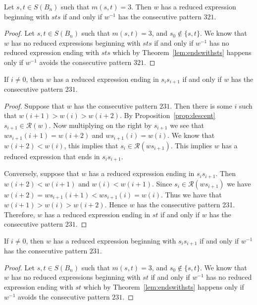 \begin{corollary}\label{lem:endswithsts}
	Let $s,t \in S(B_n)$ such that $m(s,t)=3$. Then $w$ has a reduced expression beginning with $sts$ if and only if $w^{-1}$ has the consecutive pattern $321$.
	\begin{proof}
		Let $s,t \in S(B_n)$ such that $m(s,t)=3$, and $s_0 \notin\{s,t\}$. We know that $w$ has no reduced expressions beginning with $sts$ if and only if $w^{-1}$ has no reduced expression ending with $sts$ which by Theorem~\ref{lem:endswithsts} happens only if $w^{-1}$ avoids the consecutive pattern $321$.
	\end{proof}
\end{corollary}

\begin{lemma}\label{lem:ts}
If $i \neq 0$, then $w$ has a reduced expression ending in $s_is_{i+1}$ if and only if $w$ has the consecutive pattern $231$.
\begin{proof}	
	Suppose that $w$ has the consecutive pattern $231$. Then there is some $i$ such that $w(i+1)>w(i)>w(i+2)$. By Proposition~\ref{prop:descent} $s_{i+1} \in \mathcal{R}(w)$. Now multiplying on the right by $s_{i+1}$ we see that $ws_{i+1}(i+1)=w(i+2)$ and $ws_{i+1}(i)=w(i)$. We know that $w(i+2)<w(i)$, this implies that $s_i \in \mathcal{R}(ws_{i+1})$. This implies $w$ has a reduced expression that ends in $s_is_{i+1}$.
	
	 Conversely, suppose that $w$ has a reduced expression ending in $s_is_{i+1}$. Then $w(i+2)<w(i+1)$ and $w(i)<w(i+1)$. Since $s_i \in \mathcal{R}(ws_{i+1})$ we have $w(i+2)=ws_{i+1}(i+1)<ws_{i+1}(i)=w(i)$. Thus we have that $w(i+1) > w(i) > w(i+2)$. Hence $w$ has the consecutive pattern 231.
	Therefore, $w$ has a reduced expression ending in $st$ if and only if $w$ has the consecutive pattern $231$.
\end{proof}	
\end{lemma}

\begin{corollary}\label{lem:endswithst}
	If $i \neq 0$, then $w$ has a reduced expression beginning with $s_is_{i+1}$ if and only if $w^{-1}$ has the consecutive pattern $231$.
	\begin{proof}
		Let $s,t \in S(B_n)$ such that $m(s,t)=3$, and $s_0 \notin\{s,t\}$. We know that $w$ has no reduced expressions beginning with $st$ if and only if $w^{-1}$ has no reduced expression ending with $st$ which by Theorem~\ref{lem:endswithsts} happens only if $w^{-1}$ avoids the consecutive pattern $231$.
	\end{proof}
\end{corollary}

